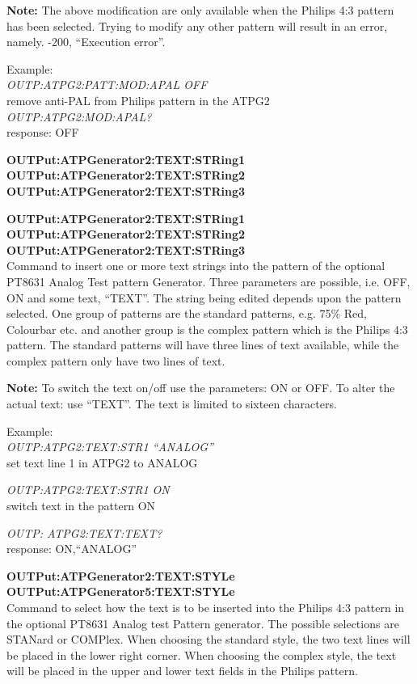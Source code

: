 \textbf{Note:} The above modification are only available when the Philips 4:3 pattern has been selected. Trying to modify any other pattern will result in an error, namely. -200, ``Execution error''.

Example:\\
\textit{OUTP:ATPG2:PATT:MOD:APAL OFF}\\
remove anti-PAL from Philips pattern in the ATPG2\\
\textit{OUTP:ATPG2:MOD:APAL?}\\
response: OFF

\textbf{OUTPut:ATPGenerator2:TEXT:STRing1}\\
\textbf{OUTPut:ATPGenerator2:TEXT:STRing2}\\
\textbf{OUTPut:ATPGenerator2:TEXT:STRing3}

\textbf{OUTPut:ATPGenerator2:TEXT:STRing1}\\
\textbf{OUTPut:ATPGenerator2:TEXT:STRing2}\\
\textbf{OUTPut:ATPGenerator2:TEXT:STRing3}\\
Command to insert one or more text strings into the pattern of the optional PT8631 Analog Test pattern Generator. Three parameters are possible, i.e. OFF, ON and some text, ``TEXT''. The string being edited depends upon the pattern selected. One group of patterns are the
standard patterns, e.g. 75\% Red, Colourbar etc. and another group is the complex pattern which is the Philips 4:3 pattern. The standard patterns will have three lines of text available, while the complex pattern only have two lines of text.

\textbf{Note:} To switch the text on/off use the parameters: ON or OFF. To alter the actual text: use ``TEXT''. The text is limited to sixteen characters. %

Example:\\
\textit{OUTP:ATPG2:TEXT:STR1 ``ANALOG''}\\
set text line 1 in ATPG2 to ANALOG

\textit{OUTP:ATPG2:TEXT:STR1 ON}\\
switch text in the pattern ON

\textit{OUTP: ATPG2:TEXT:TEXT?}\\
response: ON,``ANALOG''

\textbf{OUTPut:ATPGenerator2:TEXT:STYLe}\\
\textbf{OUTPut:ATPGenerator5:TEXT:STYLe}\\
Command to select how the text is to be inserted into the Philips 4:3 pattern in the optional PT8631 Analog test Pattern generator. The possible selections are STANard or COMPlex. When choosing the standard style, the two text lines will be placed in the lower right corner.
When choosing the complex style, the text will be placed in the upper and lower text fields in the Philips pattern.

